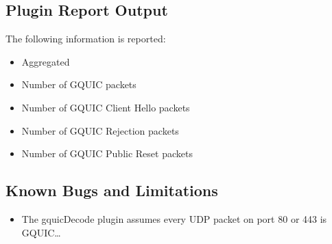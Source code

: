 \documentclass[documentation]{subfiles}
\begin{document}
\subsection{Plugin Report Output}
The following information is reported:
\begin{itemize}
    \item Aggregated {\tt{}}
    \item Number of GQUIC packets
    \item Number of GQUIC Client Hello packets
    \item Number of GQUIC Rejection packets
    \item Number of GQUIC Public Reset packets
\end{itemize}

\subsection{Known Bugs and Limitations}
\begin{itemize}
    \item The gquicDecode plugin assumes every UDP packet on port 80 or 443 is GQUIC\ldots
\end{itemize}

\end{document}
